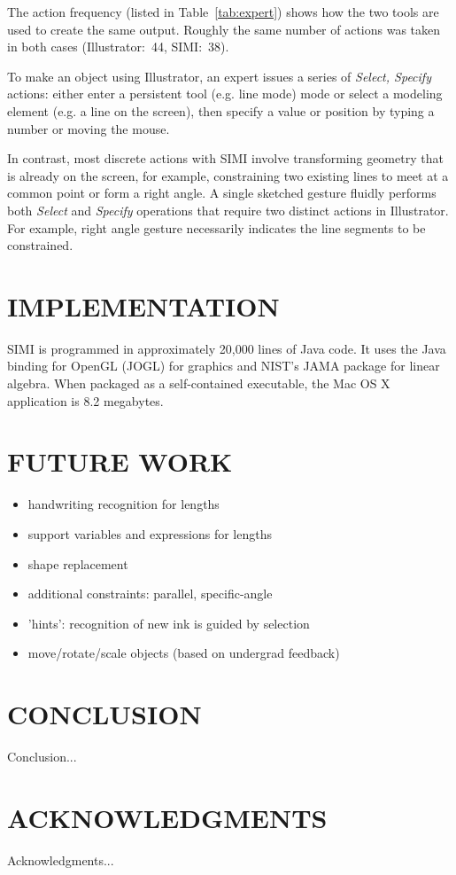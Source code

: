 \documentclass{article}
\begin{document}
The action frequency (listed in Table~\ref{tab:expert}) shows how the
two tools are used to create the same output. Roughly the same number
of actions was taken in both cases (Illustrator:~44, SIMI:~38).

To make an object using Illustrator, an expert issues a series of
\textit{Select, Specify} actions: either enter a persistent tool
(e.g. line mode) mode or select a modeling element (e.g. a line on the
screen), then specify a value or position by typing a number or moving
the mouse.

In contrast, most discrete actions with SIMI involve transforming
geometry that is already on the screen, for example, constraining two
existing lines to meet at a common point or form a right angle. A
single sketched gesture fluidly performs both \textit{Select} and
\textit{Specify} operations that require two distinct actions in
Illustrator. For example, right angle gesture necessarily indicates
the line segments to be constrained.

\section{IMPLEMENTATION}

SIMI is programmed in approximately 20,000 lines of Java code. It uses
the Java binding for OpenGL (JOGL) for graphics and NIST's JAMA
package for linear algebra. When packaged as a self-contained
executable, the Mac OS X application is 8.2 megabytes.

\section{FUTURE WORK}

\begin{itemize}
\item handwriting recognition for lengths
\item support variables and expressions for lengths
\item shape replacement
\item additional constraints: parallel, specific-angle
\item 'hints': recognition of new ink is guided by selection
\item move/rotate/scale objects (based on undergrad feedback)
\end{itemize}

\section{CONCLUSION}

Conclusion...

\section{ACKNOWLEDGMENTS}


Acknowledgments...


\end{document}
